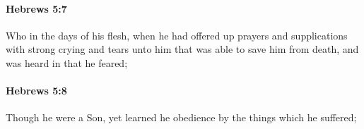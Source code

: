 		\paragraph{Hebrews 5:7} %
			\label{HEBREWS-5-7}

			Who in the days of his flesh, when he had offered up prayers and supplications with strong crying and tears unto him that was able to save him from death, and was heard in that he feared;

			\begin{framed}
			\scriptsize
				\begin{compactdesc}
					\item[SBLG] 
				\end{compactdesc}
			\end{framed}

		\paragraph{Hebrews 5:8} %
			\label{HEBREWS-5-8}

			Though he were a Son, yet learned he obedience by the things which he suffered;

